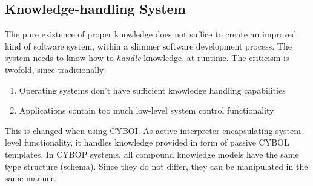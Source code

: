 %
%
%
%
%
%
%

\subsection{Knowledge-handling System}
\label{knowledge_handling_system_heading}

The pure existence of proper knowledge does not suffice to create an improved
kind of software system, within a slimmer software development process. The
system needs to know how to \emph{handle} knowledge, at runtime. The criticism
is twofold, since traditionally:

\begin{enumerate}
    \item Operating systems don't have sufficient knowledge handling capabilities
    \item Applications contain too much low-level system control functionality
\end{enumerate}

This is changed when using CYBOI. As active interpreter encapsulating
system-level functionality, it handles knowledge provided in form of passive
CYBOL templates. In CYBOP systems, all compound knowledge models have the same
type structure (schema). Since they do not differ, they can be manipulated in
the same manner.

